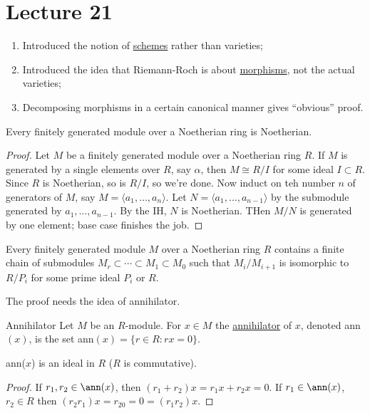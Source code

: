 \documentclass[twoside, openright, fontsize=10pt, headings=big]{scrbook}
\begin{document}
\chapter{Lecture 21}
\begin{enumerate}
    \item Introduced the notion of \underline{schemes} rather than varieties;
    \item Introduced the idea that Riemann-Roch is about \underline{morphisms}, not the actual varieties;
    \item Decomposing morphisms in a certain canonical manner gives ``obvious'' proof.
\end{enumerate}
\begin{proposition}{}{}
    Every finitely generated module over a Noetherian ring is Noetherian.
\end{proposition}
\begin{proof}
    Let $M$ be a finitely generated module over a Noetherian ring $R$. If $M$ is generated by a single elements over $R$, say $\alpha$, then $M\cong R/I$ for some ideal $I\subset R$. Since $R$ is Noetherian, so is $R/I$, so we're done. Now induct on teh number $n$ of generators of $M$, say $M=\langle a_1,\dots,a_n \rangle$. Let $N=\langle a_1,\dots,a_{n-1} \rangle$ by the submodule generated by $a_1,\dots,a_{n-1}$. By the IH, $N$ is Noetherian. THen $M/N$ is generated by one element; base case finishes the job. 
\end{proof}
\begin{proposition}{}{}
    Every finitely generated module $M$ over a Noetherian ring $R$ contains a finite chain of submodules $M_r\subset\cdots\subset M_1\subset M_0$ such that $M_i/M_{i+1}$ is isomorphic to $R/P_i$ for some prime ideal $P_i$ or $R$.
\end{proposition}
The proof needs the idea of annihilator.
\begin{definition}{Annihilator}{}
    Let $M$ be an $R$-module. For $x\in M$ the \underline{annihilator} of $x$, denoted ann$(x)$, is the set ann$(x)=\{r\in R:rx=0\}$. 
\end{definition}
\begin{lemma}{}{}
    ann($x$) is an ideal in $R$ ($R$ is commutative).
\end{lemma}
\begin{proof}
    If $r_1,r_2\in\ann(x)$, then $(r_1+r_2)x=r_1x+r_2x=0$. If $r_1\in\ann(x)$, $r_2\in R$ then $(r_2r_1)x=r_20=0=(r_1r_2)x$.
\end{proof}
\end{document}
